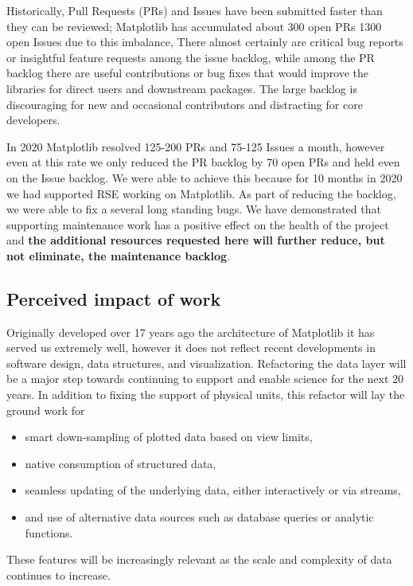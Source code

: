 \documentclass[12pt]{article}
\numberwithin{page}{section}
\begin{document}





Historically, Pull Requests (PRs) and Issues have been submitted
faster than they can be reviewed; Matplotlib has accumulated about 300
open PRs 1300 open Issues due to this imbalance, There almost
certainly are critical bug reports or insightful feature requests among
the issue backlog, while among the PR backlog there are useful contributions
or bug fixes that would improve the libraries for direct users and
downstream packages.  The large backlog is discouraging for new and
occasional contributors and distracting for core developers.

In 2020 Matplotlib resolved 125-200 PRs and 75-125 Issues a month,
however even at this rate we only reduced the PR backlog by 70 open
PRs and held even on the Issue backlog.  We were able to achieve this
because for 10 months in 2020 we had supported RSE working on
Matplotlib.  As part of reducing the backlog, we were able to fix a
several long standing bugs.  We have demonstrated that supporting
maintenance work has a positive effect on the health of the project
and \textbf{the additional resources requested here will further
  reduce, but not eliminate, the maintenance backlog}.


\subsection{Perceived impact of work}


Originally developed over 17 years ago the architecture of Matplotlib
it has served us extremely well, however it does not reflect recent
developments in software design, data structures, and visualization.
Refactoring the data layer will be a major step towards continuing to
support and enable science for the next 20 years.  In addition to fixing
the support of physical units, this refactor will lay the ground work for
\begin{itemize}[noitemsep]
  \item smart down-sampling of plotted data based on view limits,
  \item native consumption of structured data,
  \item seamless updating of the underlying data, either interactively
    or via streams,
  \item and use of alternative data sources such as database queries
    or analytic functions.
\end{itemize}
These features will be increasingly relevant as the scale and complexity
of data continues to increase.
\end{document}
